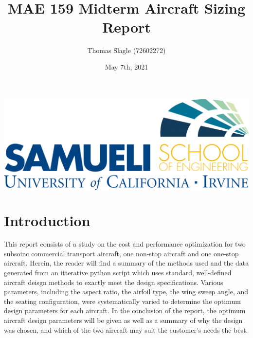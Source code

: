 \documentclass{article}
\title{MAE 159 Midterm Aircraft Sizing Report}
\author{Thomas Slagle (72602272)}
\date{May 7th, 2021}
\begin{document}
    \maketitle
    \begin{center}
        \includegraphics[scale=0.4]{pngjoy.com_uci-logo-uc-irvine-henry-samueli-school-of_6860660.png}
    \end{center}

    \pagebreak
    \tableofcontents
    \pagebreak
    \listoffigures
    \listoftables
    \pagebreak

    \section{Introduction}
    \label{sec:intro}
    \begin{flushleft}
        This report consists of a study on the cost and performance optimization
        for two subsoinc commercial transport aircraft, one non-stop aircraft
        and one one-stop aircraft. Herein, the reader will find a summary of the
        methods used and the data generated from an itterative python script
        which uses standard, well-defined aircraft deisgn methods to exactly
        meet the design specifications. Various parameters, including the aspect
        ratio, the airfoil type, the wing sweep angle, and the seating
        configuration, were systematically varied to determine the optimum
        design parameters for each aircraft. In the conclusion of the report,
        the optimum aircraft design parameters will be given as well as a
        summary of why the design was chosen, and which of the two
        aircraft may suit the customer's needs the best.
    \end{flushleft}
\end{document}
